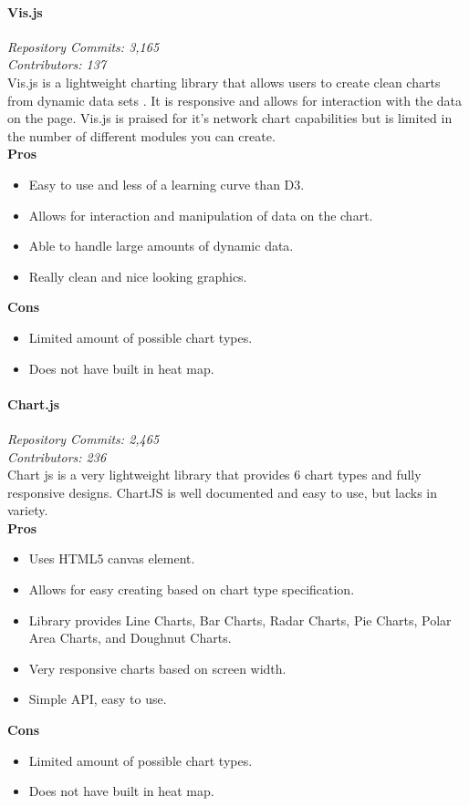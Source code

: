 \paragraph{Vis.js}
\textit{Repository Commits: 3,165}\\
\textit{Contributors: 137}\\
Vis.js is a lightweight charting library that allows users to create clean charts from dynamic data sets \cite{vis}. It is responsive and allows for interaction with the data on the page. Vis.js is praised for it's network chart capabilities but is limited in the number of different modules you can create.\\
\textbf{Pros}
\begin{itemize}
\item Easy to use and less of a learning curve than D3.
\item Allows for interaction and manipulation of data on the chart.
\item Able to handle large amounts of dynamic data.
\item Really clean and nice looking graphics.
\end{itemize}
\textbf{Cons}
\begin{itemize}
\item Limited amount of possible chart types.
\item Does not have built in heat map.
\end{itemize}
\paragraph{Chart.js}
\textit{Repository Commits: 2,465}\\ 
\textit{Contributors: 236}\\
Chart js is a very lightweight library that provides 6 chart types and fully responsive designs. ChartJS is well documented and easy to use, but lacks in variety.\\
\textbf{Pros}
\begin{itemize}
\item Uses HTML5 canvas element.
\item Allows for easy creating based on chart type specification.
\item Library provides Line Charts, Bar Charts, Radar Charts, Pie Charts, Polar Area Charts, and Doughnut Charts.
\item Very responsive charts based on screen width.
\item Simple API, easy to use.
\end{itemize}
\textbf{Cons}
\begin{itemize}
\item Limited amount of possible chart types.
\item Does not have built in heat map.
\end{itemize}
